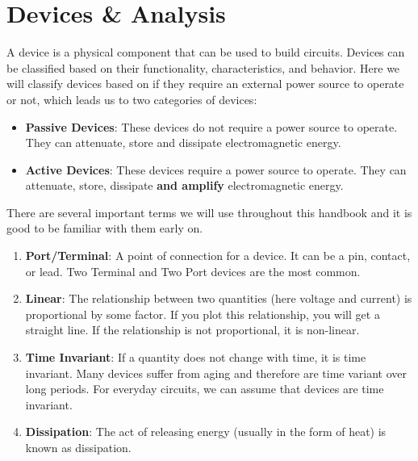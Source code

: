 \chapter{Devices \& Analysis}

A device is a physical component that can be used to build circuits.
Devices can be classified based on their functionality, characteristics,
and behavior. Here we will classify devices based on if they require
an external power source to operate or not, which leads us to two
categories of devices:
\begin{itemize}
    \item \textbf{Passive Devices}: These devices do not require a power
      source to operate. They can attenuate, store and dissipate
      electromagnetic energy.
    \item \textbf{Active Devices}: These devices require a power source to
      operate. They can attenuate, store, dissipate \textbf{and amplify}
      electromagnetic energy.
\end{itemize}

There are several important terms we will use throughout this handbook
and it is good to be familiar with them early on.
\begin{enumerate}
    \item \textbf{Port/Terminal}: A point of connection for a device.
      It can be a pin, contact, or lead. Two Terminal and Two Port
      devices are the most common.
    \item \textbf{Linear}: The relationship between two quantities (here
      voltage and current) is proportional by some factor. If you plot
      this relationship, you will get a straight line. If the relationship
      is not proportional, it is non-linear.
    \item \textbf{Time Invariant}: If a quantity does not change with time,
      it is time invariant. Many devices suffer from aging and therefore
      are time variant over long periods. For everyday circuits, we can
      assume that devices are time invariant.
    \item \textbf{Dissipation}: The act of releasing energy (usually in the
      form of heat) is known as dissipation.
\end{enumerate}








